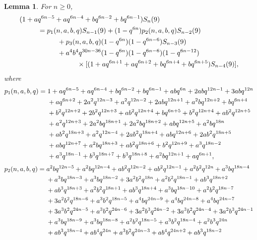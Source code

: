 \documentclass[12pt,twoside]{amsart}
\newtheorem{Lemma}[Theorem]{Lemma}
\theoremstyle{remark}
\numberwithin{equation}{section}
\begin{document}
\begin{Lemma}\label{lem:2}
For  $n\geq 0$,
\begin{align} \label{eq:Id}
 (1+a&q^{6n-5}+aq^{6n-4}+bq^{6n-2}+bq^{6n-1})S_n(9)\\
\notag
& = p_1(n,a,b,q)S_{n-1}(9)+(1-q^{6n})p_2(n,a,b,q)S_{n-2}(9)\\
\notag
&\kern1cm
+p_3(n,a,b,q)(1-q^{6n})
(1-q^{6n-6})S_{n-3}(9)\\
\notag
&\kern1cm
+a^4b^4q^{30n-36}(1-q^{6n})(1-q^{6n-6})(1-q^{6n-12})\\
\notag
&\kern2cm
\times[(1+aq^{6n+1}+aq^{6n+2}+bq^{6n+4}+bq^{6n+5})S_{n-4}(9)],
\end{align}
where
\begin{align} \label{eq:34}
 p_1(n,a,b,q) ={}&
1+aq^{6n-5}+aq^{6n-4}+bq^{6n-2}+bq^{6n-1}+abq^{6n}+2abq^{12n-1}+3abq^{12n}\\
\notag
&
+aq^{6n+2}+2a^2q^{12n-3}+a^2q^{12n-2}+2abq^{12n+1}+a^2bq^{12n+2}+bq^{6n+4}\\
\notag
&
+b^2q^{12n+2}+2b^2q^{12n+3}+ab^2q^{12n+4}+bq^{6n+5}+b^2q^{12n+4}+ab^2q^{12n+5}\\
\notag
&
+a^2q^{12n+3}+2a^2bq^{18n+1}+2a^2bq^{18n+2}+abq^{12n+5}+a^2bq^{18n}\\
\notag
& +ab^2q^{18n+3}+a^2q^{12n-4}+2ab^2q^{18n+4}+abq^{12n+6}+2ab^2q^{18n+5}\\
\notag
&+abq^{12n+7}+a^2bq^{18n+3}+ab^2q^{18n+6}+b^2q^{12n+9}+a^3q^{18n-2}\\
\notag
&+a^3q^{18n-1}+b^3q^{18n+7}+b^3q^{18n+8}+a^2bq^{12n+1}+aq^{6n+1},
\end{align}
\begin{align}\label{eq:35}
 p_2(n,a,b,q) ={}&
a^2bq^{12n-5}+a^2bq^{12n-4}+ab^2q^{12n-2}+ab^2q^{12n-1}+a^2b^2q^{12n}+a^3bq^{18n-4}\\
\notag
&+a^3bq^{18n-3}+a^3bq^{18n-2}+3a^2b^2q^{18n}+a^2b^2q^{18n-1}+ab^3q^{18n+2}\\
\notag
&+ab^3q^{18n+3}+a^2b^2q^{18n+1}+ab^3q^{18n+4}+a^3bq^{18n-10}+a^2b^2q^{18n-7}
\\
\notag
&+3a^2b^2q^{18n-6}+a^3b^2q^{18n-5}+a^4bq^{24n-9}+a^4bq^{24n-8}+a^4bq^{24n-7}\\
\notag
&+3a^3b^2q^{24n-5}+a^3b^2q^{24n-6}+3a^2b^3q^{24n-2}+3a^3b^2q^{24n-4}+3a^2b^3q^{24n-1}\\
\notag
&+a^3bq^{18n-9}+a^3bq^{18n-8}+a^2b^2q^{18n-5}+a^3b^2q^{18n-4}+a^2b^3q^{24n}\\
\notag
&+ab^3q^{18n-4}+ab^4q^{24n}+a^3b^2q^{24n-3}+ab^4q^{24n+2}+ab^3q^{18n-2}\\

\end{align}
\end{Lemma}
\end{document}
